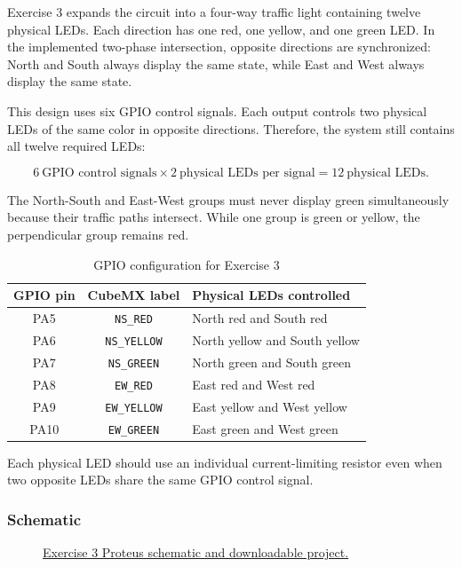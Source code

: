 \documentclass[a4paper]{article}
\newcommand{\exerciseThreeURL}{https://github.com/USERNAME/REPOSITORY}
\begin{document}
Exercise 3 expands the circuit into a four-way traffic light containing twelve
physical LEDs. Each direction has one red, one yellow, and one green LED. In
the implemented two-phase intersection, opposite directions are synchronized:
North and South always display the same state, while East and West always
display the same state.

This design uses six GPIO control signals. Each output controls two physical
LEDs of the same color in opposite directions. Therefore, the system still
contains all twelve required LEDs:

\[
    6\ \text{GPIO control signals}
    \times 2\ \text{physical LEDs per signal}
    = 12\ \text{physical LEDs}.
\]

The North-South and East-West groups must never display green simultaneously
because their traffic paths intersect. While one group is green or yellow, the
perpendicular group remains red.

\begin{table}[H]
    \centering
    \caption{GPIO configuration for Exercise 3}
    \label{tab:exercise3-gpio}
    \begin{tabular}{ccl}
        \toprule
        \textbf{GPIO pin} & \textbf{CubeMX label} & \textbf{Physical LEDs controlled} \\
        \midrule
        PA5  & \texttt{NS\_RED}    & North red and South red \\
        PA6  & \texttt{NS\_YELLOW} & North yellow and South yellow \\
        PA7  & \texttt{NS\_GREEN}  & North green and South green \\
        PA8  & \texttt{EW\_RED}    & East red and West red \\
        PA9  & \texttt{EW\_YELLOW} & East yellow and West yellow \\
        PA10 & \texttt{EW\_GREEN}  & East green and West green \\
        \bottomrule
    \end{tabular}
\end{table}

Each physical LED should use an individual current-limiting resistor even when
two opposite LEDs share the same GPIO control signal.

\subsubsection{Schematic}

\begin{figure}[H]
    \centering
    \caption{\href{\exerciseThreeURL}{Exercise 3 Proteus schematic and downloadable project.}}
    \label{fig:exercise3-schematic}
\end{figure}
\end{document}
